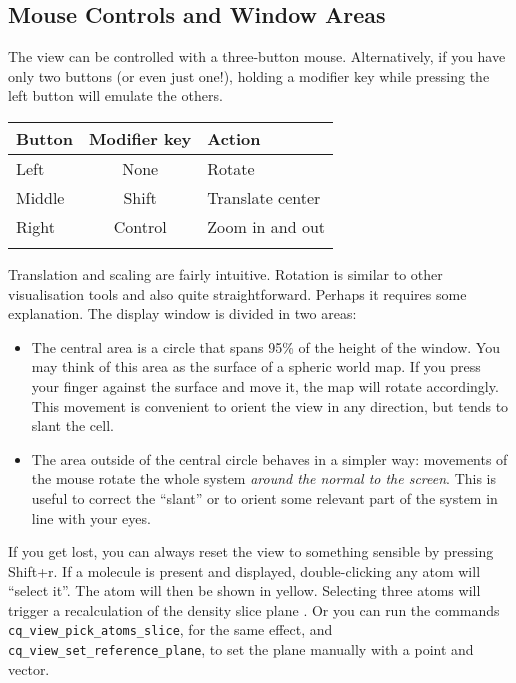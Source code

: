 \documentclass[a4paper,notitlepage,11pt]{article}
\begin{document}
\subsection{Mouse Controls and Window Areas}
\label{sec:areas}

The view can be controlled with a three-button mouse. Alternatively, 
if you have only two buttons (or even just one!), holding a modifier key
while pressing the left button will emulate the others.

\begin{tabular}{lcl}
\\
\hline \hline
Button&Modifier key&Action\\
\hline
Left&None&Rotate\\
Middle&Shift&Translate center\\
Right&Control&Zoom in and out\\
\hline \hline
\\
\end{tabular}
 
\noindent Translation and scaling are fairly intuitive. Rotation is similar to other visualisation 
tools and also quite straightforward. Perhaps it requires some explanation. 
The display window is divided in two areas: 

\begin{itemize}
\item The central area is a circle that spans 95\% 
of the height of the window. You may think of this area as the surface of a 
spheric world map. If you press your finger against the surface and move it, the map
will rotate accordingly. This movement is convenient to orient the view in any direction, 
but tends to slant the cell.

\item The area outside of the central circle behaves in a simpler way: movements of the mouse
rotate the whole system \emph{around the normal to the screen}. This is useful to correct 
the ``slant'' or to orient some relevant part of the system in line with your eyes.
\end{itemize}

If you get lost, you can always reset the view to something sensible by
pressing Shift+r. If a molecule is present and displayed, double-clicking any
atom will ``select it''. The atom will then be shown in yellow. Selecting three atoms will trigger a recalculation of the density slice plane .
Or you can run the commands \texttt{cq\_view\_pick\_atoms\_slice}, for the same effect, and 
\texttt{cq\_view\_set\_reference\_plane}, to set the plane manually with a point and vector.
\end{document}
